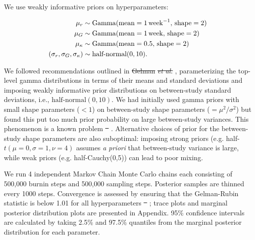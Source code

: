\documentclass[12pt]{article}
\providecommand{\DIFaddtex}[1]{{\protect\color{blue}\uwave{#1}}} %
\providecommand{\DIFdeltex}[1]{{\protect\color{red}\sout{#1}}}                      %
\providecommand{\DIFaddbegin}{} %
\providecommand{\DIFaddend}{} %
\providecommand{\DIFdelbegin}{} %
\providecommand{\DIFdelend}{} %
\providecommand{\DIFadd}[1]{\texorpdfstring{\DIFaddtex{#1}}{#1}} %
\providecommand{\DIFdel}[1]{\texorpdfstring{\DIFdeltex{#1}}{}} %
\newcommand{\DIFscaledelfig}{0.5}
\newlength{\DIFdelgraphicswidth} %
\newlength{\DIFdelgraphicsheight} %
\newcommand{\DIFaddincludegraphics}[2][]{{\color{blue}\fbox{\DIFOincludegraphics[#1]{#2}}}} %
\newcommand{\DIFdelincludegraphics}[2][]{%
\sbox{\DIFdelgraphicsbox}{\DIFOincludegraphics[#1]{#2}}%
\settoboxwidth{\DIFdelgraphicswidth}{\DIFdelgraphicsbox} %
\settoboxtotalheight{\DIFdelgraphicsheight}{\DIFdelgraphicsbox} %
\scalebox{\DIFscaledelfig}{%
\parbox[b]{\DIFdelgraphicswidth}{\usebox{\DIFdelgraphicsbox}\\[-\baselineskip] \rule{\DIFdelgraphicswidth}{0em}}\llap{\resizebox{\DIFdelgraphicswidth}{\DIFdelgraphicsheight}{%
\setlength{\unitlength}{\DIFdelgraphicswidth}%
\begin{picture}(1,1)%
\thicklines\linethickness{2pt} %
{\color[rgb]{1,0,0}\put(0,0){\framebox(1,1){}}}%
{\color[rgb]{1,0,0}\put(0,0){\line( 1,1){1}}}%
{\color[rgb]{1,0,0}\put(0,1){\line(1,-1){1}}}%
\end{picture}%
}\hspace*{3pt}}} %
} %
\DeclareRobustCommand{\DIFaddbegin}{\DIFOaddbegin \let\includegraphics\DIFaddincludegraphics} %
\DeclareRobustCommand{\DIFaddend}{\DIFOaddend \let\includegraphics\DIFOincludegraphics} %
\DeclareRobustCommand{\DIFdelbegin}{\DIFOdelbegin \let\includegraphics\DIFdelincludegraphics} %
\DeclareRobustCommand{\DIFdelend}{\DIFOaddend \let\includegraphics\DIFOincludegraphics} %
\begin{document}
We use weakly informative priors on hyperparameters:
\begin{linenomath*}
\begin{equation}
\begin{aligned}
\mu_r &\sim \mathrm{Gamma}(\mathrm{mean}=1\,\mathrm{week}^{-1},\,\mathrm{shape}=2)\\
\mu_G &\sim \mathrm{Gamma}(\mathrm{mean}=1\,\mathrm{week},\,\mathrm{shape}=2)\\
\mu_\kappa &\sim \mathrm{Gamma}(\mathrm{mean}=0.5,\,\mathrm{shape}=2)\\
(\sigma_r, \sigma_G, \sigma_\kappa) &\sim \textrm{half-normal}(0, 10).
\end{aligned}
\end{equation}
\end{linenomath*}
We followed recommendations outlined in \DIFdelbegin \DIFdel{Gelman }\textit{\DIFdel{et al.}} %
\DIFdelend \cite{gelman2006prior}, parameterizing the top-level gamma distributions in terms of their means and standard deviations and imposing weakly informative prior distributions on between-study standard deviations, i.e., $\textrm{half-normal}(0, 10)$.
We had initially used gamma priors with small shape parameters ($< 1$) on between-study shape parameters ($=\mu^2/\sigma^2$) but found this put too much prior probability on large between-study variances. This phenomenon is a known problem \DIFdelbegin \DIFdel{\mbox{%
\cite{gelman2006prior}}\hspace{0pt}%
}\DIFdelend \DIFaddbegin \DIFadd{\mbox{%
\citep{gelman2006prior}}\hspace{0pt}%
}\DIFaddend .
Alternative choices of prior for the between-study shape parameters are also suboptimal: imposing strong priors (e.g. half-$t(\mu=0,\sigma=1,\nu=4)$  assumes \textit{a priori} that between-study variance is large,  while weak priors (e.g. half-Cauchy(0,5)) can lead to poor mixing.

We run 4 independent Markov Chain Monte Carlo chains each consisting of 500,000 burnin steps and 500,000 sampling steps.
Posterior samples are thinned every 1000 steps.
Convergence is assessed by ensuring that the Gelman-Rubin statistic is below 1.01 for all hyperparameters \DIFdelbegin \DIFdel{\mbox{%
\cite{gelman1992inference}}\hspace{0pt}%
}\DIFdelend \DIFaddbegin \DIFadd{\mbox{%
\citep{gelman1992inference}}\hspace{0pt}%
}\DIFaddend ;
trace plots and marginal posterior distribution plots are presented in Appendix.
95\% confidence intervals are calculated by taking 2.5\% and 97.5\% quantiles from the marginal posterior distribution for each parameter.
\end{document}
